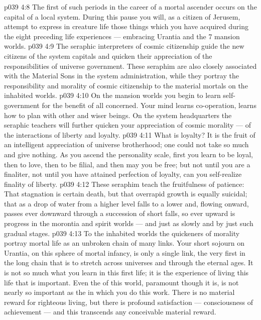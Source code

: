 \vs p039 4:8 The first of such periods in the career of a mortal ascender occurs on the capital of a local system. During this pause you will, as a citizen of Jerusem, attempt to express in creature life those things which you have acquired during the eight preceding life experiences --- embracing Urantia and the 7 mansion worlds.
\vs p039 4:9 The seraphic interpreters of cosmic citizenship guide the new citizens of the system capitals and quicken their appreciation of the responsibilities of universe government. These seraphim are also closely associated with the Material Sons in the system administration, while they portray the responsibility and morality of cosmic citizenship to the material mortals on the inhabited worlds.
\vs p039 4:10 \bibnobreakspace {} On the mansion worlds you begin to learn self\hyp{}government for the benefit of all concerned. Your mind learns co\hyp{}operation, learns how to plan with other and wiser beings. On the system headquarters the seraphic teachers will further quicken your appreciation of cosmic morality --- of the interactions of liberty and loyalty.
\vs p039 4:11 What is loyalty? It is the fruit of an intelligent appreciation of universe brotherhood; one could not take so much and give nothing. As you ascend the personality scale, first you learn to be loyal, then to love, then to be filial, and then may you be free; but not until you are a finaliter, not until you have attained perfection of loyalty, can you self\hyp{}realize finality of liberty.
\vs p039 4:12 \pc These seraphim teach the fruitfulness of patience: That stagnation is certain death, but that overrapid growth is equally suicidal; that as a drop of water from a higher level falls to a lower and, flowing onward, passes ever downward through a succession of short falls, so ever upward is progress in the morontia and spirit worlds --- and just as slowly and by just such gradual stages.
\vs p039 4:13 To the inhabited worlds the quickeners of morality portray mortal life as an unbroken chain of many links. Your short sojourn on Urantia, on this sphere of mortal infancy, is only a single link, the very first in the long chain that is to stretch across universes and through the eternal ages. It is not so much what you learn in this first life; it is the experience of living this life that is important. Even the  of this world, paramount though it is, is not nearly so important as the  in which you do this work. There is no material reward for righteous living, but there is profound satisfaction --- consciousness of achievement --- and this transcends any conceivable material reward.

